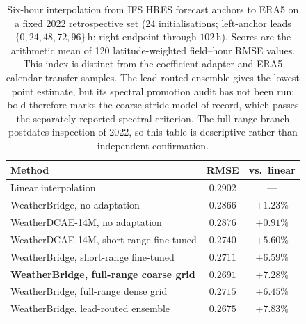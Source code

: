 \begin{table}[t]
\centering
\caption{Six-hour interpolation from IFS HRES forecast anchors to ERA5 on a
fixed 2022 retrospective set (24 initialisations; left-anchor leads
$\{0,24,48,72,96\}\,$h; right endpoint through $102\,$h). Scores are the
arithmetic mean of 120 latitude-weighted field--hour RMSE values. This index is
distinct from the coefficient-adapter and ERA5 calendar-transfer samples. The
lead-routed ensemble gives the lowest point estimate, but its spectral
promotion audit has not been run; bold therefore marks the
coarse-stride model of record, which passes the separately reported spectral
criterion. The full-range branch postdates inspection of 2022, so this table is
descriptive rather than independent confirmation.}
\label{tab:hres-retrospective-2022}
\begin{tabular}{lcc}
\toprule
Method & RMSE & vs.\ linear \\
\midrule
Linear interpolation                     & $0.2902$          & ---                 \\
WeatherBridge, no adaptation              & $0.2866$          & $+1.23\%$           \\
WeatherDCAE-14M, no adaptation            & $0.2876$          & $+0.91\%$           \\
WeatherDCAE-14M, short-range fine-tuned   & $0.2740$          & $+5.60\%$           \\
WeatherBridge, short-range fine-tuned     & $0.2711$          & $+6.59\%$           \\
\textbf{WeatherBridge, full-range coarse grid} & $\mathbf{0.2691}$ & $\mathbf{+7.28\%}$ \\
WeatherBridge, full-range dense grid      & $0.2715$          & $+6.45\%$           \\
WeatherBridge, lead-routed ensemble       & $0.2675$          & $+7.83\%$           \\
\bottomrule
\end{tabular}
\end{table}
